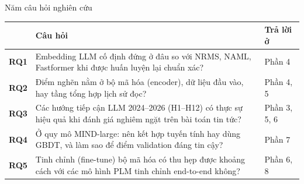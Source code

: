 \documentclass[aspectratio=169,t]{beamer}
\begin{document}
\begin{frame}[shrink]{Năm câu hỏi nghiên cứu}
\footnotesize
\renewcommand{\arraystretch}{1.3}
\begin{tabularx}{\textwidth}{@{}lYl@{}}
\toprule
 & \textbf{Câu hỏi} & \textbf{Trả lời ở}\\
\midrule
\textbf{RQ1} & Embedding LLM cố định đứng ở đâu so với NRMS, NAML, Fastformer khi được huấn luyện lại chuẩn xác? & Phần 4\\
\textbf{RQ2} & Điểm nghẽn nằm ở bộ mã hóa (encoder), dữ liệu đầu vào, hay tầng tổng hợp lịch sử đọc? & Phần 4, 5\\
\textbf{RQ3} & Các hướng tiếp cận LLM 2024--2026 (H1--H12) có thực sự hiệu quả khi đánh giá nghiêm ngặt trên bài toán tin tức? & Phần 3, 5, 6\\
\textbf{RQ4} & Ở quy mô MIND-large: nên kết hợp tuyến tính hay dùng GBDT, và làm sao để điểm validation đáng tin cậy? & Phần 7\\
\textbf{RQ5} & Tinh chỉnh (fine-tune) bộ mã hóa có thu hẹp được khoảng cách với các mô hình PLM tinh chỉnh end-to-end không? & Phần 6, 8\\
\bottomrule
\end{tabularx}
\par\kern0pt%
\end{frame}

\end{document}
